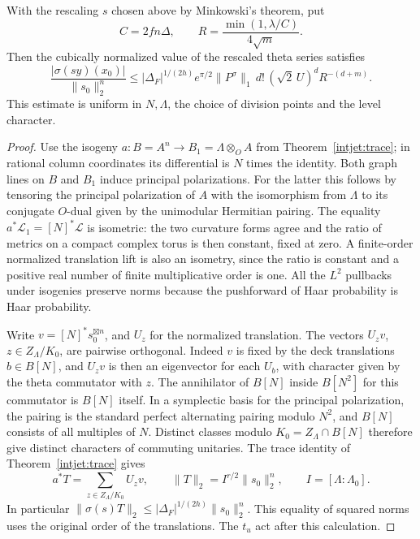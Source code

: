 \begin{proposition}
\label{intjet:arch}
With the rescaling \(s\) chosen above by Minkowski's theorem, put
\[
 C=2fn\Delta,\qquad
 R=\frac{\min(1,\lambda/C)}{4\sqrt m}.
\]
Then the cubically normalized value of the rescaled theta series satisfies
\[
 \frac{|\sigma(sy)(x_0)|}{\|s_0\|_2^n}
 \le |\Delta_F|^{1/(2h)}e^{\pi/2}
       \|P^\sigma\|_1\,d!\,(\sqrt2\,U)^d R^{-(d+m)}.
\]
This estimate is uniform in \(N,\Lambda\), the choice of division
points and the level character.
\end{proposition}
\begin{proof}
Use the isogeny \(a:B=A^n\to B_1=\Lambda\otimes_O A\) from
Theorem~\ref{intjet:trace}; in rational column coordinates its
differential is \(N\) times the identity. Both graph lines on
\(B\) and \(B_1\) induce principal polarizations. For the latter
this follows by tensoring the principal polarization of \(A\) with
the isomorphism from \(\Lambda\) to its conjugate \(O\)-dual
given by the unimodular Hermitian pairing. The equality
\(a^*\mathcal L_1=[N]^*\mathcal L\) is isometric: the two
curvature forms agree and the ratio of metrics on a compact complex
torus is then constant, fixed at zero. A finite-order normalized
translation lift is also an isometry, since the ratio is constant
and a positive real number of finite multiplicative order is one.
All the \(L^2\) pullbacks under isogenies preserve norms because
the pushforward of Haar probability is Haar probability.

Write \(v=[N]^*s_0^{\boxtimes n}\), and \(U_z\) for the normalized
translation. The vectors \(U_zv\), \(z\in Z_\Lambda/K_0\), are
pairwise orthogonal. Indeed \(v\) is fixed by the deck translations
\(b\in B[N]\), and \(U_zv\) is then an eigenvector for each
\(U_b\), with character given by the theta commutator with \(z\).
The annihilator of \(B[N]\) inside \(B[N^2]\) for this commutator
is \(B[N]\) itself. In a symplectic basis for the principal
polarization, the pairing is the standard perfect alternating
pairing modulo \(N^2\), and \(B[N]\) consists of all multiples of
\(N\). Distinct classes modulo \(K_0=Z_\Lambda\cap B[N]\) therefore
give distinct characters of commuting unitaries. The trace identity
of Theorem~\ref{intjet:trace} gives
\[
 a^*T=\sum_{z\in Z_\Lambda/K_0}U_zv,\qquad
 \|T\|_2= I^{r/2}\|s_0\|_2^n,\qquad I=[\Lambda:\Lambda_0].
\]
In particular \(\|\sigma(s)T\|_2\le
|\Delta_F|^{1/(2h)}\|s_0\|_2^n\). This equality of squared norms
uses the original order of the translations. The \(t_u\) act
after this calculation.


\end{proof}
